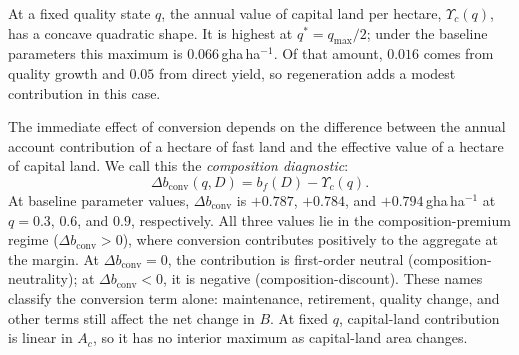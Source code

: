 \documentclass[preprint,12pt,authoryear]{elsarticle}
\newcommand{\dconv}{\Delta b_{\mathrm{conv}}}
\newcommand{\Ups}{\Upsilon_c}
\begin{document}
At a fixed quality state $q$, the annual value of capital land per hectare, $\Ups(q)$, has a concave quadratic shape. It is highest at $q^*=q_{\max}/2$; under the baseline parameters this maximum is $0.066$\,gha\,ha$^{-1}$. Of that amount, $0.016$ comes from quality growth and $0.05$ from direct yield, so regeneration adds a modest contribution in this case.

The immediate effect of conversion depends on the difference between the annual account contribution of a hectare of fast land and the effective value of a hectare of capital land. We call this the \emph{composition diagnostic}:
\begin{equation}\label{eq:dconv}
\dconv(q,D)=b_f(D)-\Ups(q).
\end{equation}
At baseline parameter values, $\dconv$ is $+0.787$, $+0.784$, and $+0.794$\,gha\,ha$^{-1}$ at $q=0.3$, $0.6$, and $0.9$, respectively. All three values lie in the composition-premium regime ($\dconv>0$), where conversion contributes positively to the aggregate at the margin. At $\dconv=0$, the contribution is first-order neutral (composition-neutrality); at $\dconv<0$, it is negative (composition-discount). These names classify the conversion term alone: maintenance, retirement, quality change, and other terms still affect the net change in $B$. At fixed $q$, capital-land contribution is linear in $A_c$, so it has no interior maximum as capital-land area changes.
\end{document}
